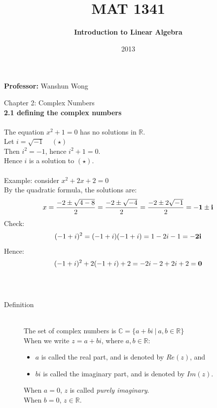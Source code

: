 \documentclass[]{article}
\begin{document}
	\title{MAT 1341}
	\author{{\bf Introduction to Linear Algebra}}
	\date{2013}
	\maketitle

	\begin{center}
		{\bf Professor:} Wanshun Wong\\
	\end{center}
	\pagebreak
	\Large{Chapter 2: Complex Numbers}\\
	\large{\bf 2.1 defining the complex numbers}\\\\
	\noindent
	\normalsize
		The equation $x^2+1=0$ has no solutions in $\mathbb{R}$.\\
		Let $i=\sqrt{-1} \ \ \ \ \ (\star)$\\
		Then $i^2=-1$, hence $i^2+1=0$.\\
		Hence $i$ is a solution to $(\star)$.\\\\
		Example: consider $x^2+2x+2=0$\\
		By the quadratic formula, the solutions are:
		$$x=\frac{-2\pm\sqrt{4-8}}{2}=\frac{-2\pm\sqrt{-4}}{2}=\frac{-2\pm 2\sqrt{-1}}{2}={\bf-1\pm i}$$
		Check:
		$$(-1+i)^2=(-1+i)(-1+i)=1-2i-1={\bf -2i}$$
		Hence:
		$$(-1+i)^2+2(-1+i)+2=-2i-2+2i+2={\bf 0}$$
		\\\\
		\begin{description}
			\item[Definition] \hfill \\
				The set of complex numbers is $\mathbb{C}=\{a+bi~|~a,b\in\mathbb{R}\}$\\
				When we write $z=a+bi$, where $a, b\in\mathbb{R}$:
				\begin{itemize}
					\item $a$ is called the real part, and is denoted by $Re(z)$, and
					\item $bi$ is called the imaginary part, and is denoted by $Im(z)$.
				\end{itemize}
				When $a=0$, $z$ is called  \emph{purely imaginary}.\\
				When $b=0$, $z\in\mathbb{R}$.
		\end{description}
\end{document}
